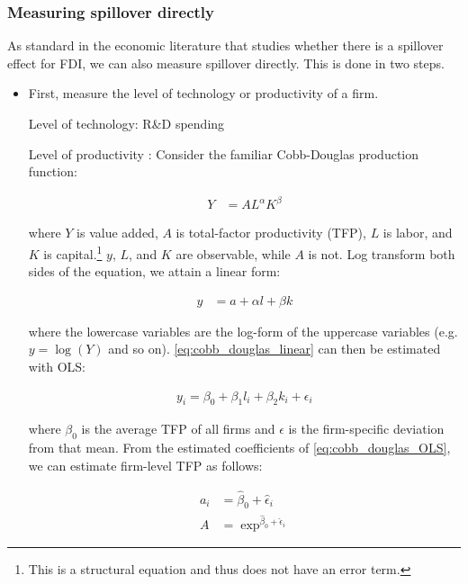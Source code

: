 \subsubsection*{Measuring spillover directly}

As standard in the economic literature that studies whether there is a spillover effect for FDI, we can also measure spillover directly. This is done in two steps.

\begin{itemize}
\item First, measure the level of technology or productivity of a firm.

Level of technology: R\&D spending

Level of productivity \citep{VanBeveren2012}: Consider the familiar Cobb-Douglas production function:

\begin{align}
Y &= AL^{\alpha}K^{\beta}
\end{align}

where $Y$ is value added, $A$ is total-factor productivity (TFP), $L$ is labor, and $K$ is capital.\footnote{This is a structural equation and thus does not have an error term.} $y$, $L$, and $K$ are observable, while $A$ is not. Log transform both sides of the equation, we attain a linear form:

\begin{align} \label{eq:cobb_douglas_linear}
y &= a + \alpha l + \beta k
\end{align}

where the lowercase variables are the log-form of the uppercase variables (e.g. $y = \log(Y)$ and so on). \autoref{eq:cobb_douglas_linear} can then be estimated with OLS:

\begin{align} \label{eq:cobb_douglas_OLS}
y_i = \beta_0 + \beta_1 l_i + \beta_2 k_i + \epsilon_i
\end{align} 

where $\beta_0$ is the average TFP of all firms and $\epsilon$ is the firm-specific deviation from that mean. From the estimated coefficients of \autoref{eq:cobb_douglas_OLS}, we can estimate firm-level TFP as follows:

\begin{align}
a_i &= \hat\beta_0 + \hat\epsilon_i \\
A &= \exp^{\hat\beta_0 + \hat\epsilon_i}
\end{align}


\end{itemize}
